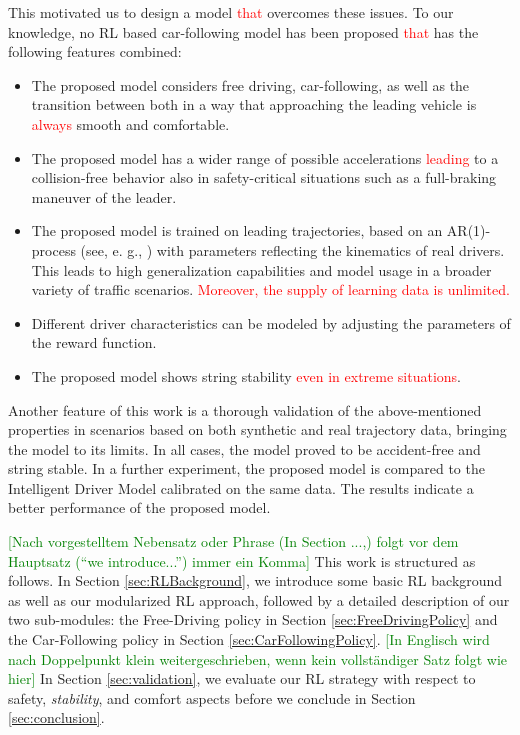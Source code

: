 \documentclass[review]{elsarticle}
\providecommand{\red}[1]{\textcolor{red}{#1}}
\providecommand{\green}[1]{\textcolor{green}{#1}}
\providecommand{\martin}[1]{\red{#1}} %
\providecommand{\martinc}[1]{\green{[#1]}} %
\providecommand{\3}{{\ss}}
\begin{document}
This motivated us to design a model \martin{that} overcomes these issues.
To our knowledge, no RL based car-following model has been proposed \martin{that} has the following features combined:


\begin{itemize}
	\item  The proposed model considers free driving,
          car-following, as well as the transition between both in a
          way that approaching the leading vehicle is \martin{always} smooth and comfortable.
	\item The proposed model has a wider range of possible
          accelerations \martin{leading} to a collision-free behavior
          also in safety-critical situations such as a full-braking maneuver of the leader.
	\item The proposed model is trained on leading trajectories,
          based on an AR(1)-process (see, e. g., \cite{HonerkampEngl})
          with parameters reflecting the kinematics of real
          drivers. This leads to high generalization capabilities and
          model usage in a broader variety of traffic
          scenarios. \martin{Moreover, the supply of learning data is
            unlimited.} 
	\item Different driver characteristics can be modeled by adjusting the parameters of the reward function.
	\item The proposed model shows string stability \martin{even in
          extreme situations}.
	
\end{itemize}

Another feature of this work is a thorough validation of the above-mentioned properties in scenarios based on both synthetic and real trajectory data, bringing the model to its limits. 
In all cases, the model proved to be accident-free and string stable.
In a further experiment, the proposed model is compared to the Intelligent Driver Model calibrated on the same data. The results indicate a better performance of the proposed model.

\martinc{Nach vorgestelltem Nebensatz oder Phrase (In Section ...,) folgt vor dem
  Hauptsatz (``we introduce...'') immer ein Komma}
This work is structured as follows. In Section \ref{sec:RLBackground},
we introduce some basic RL background as well as our modularized RL
approach, followed by a detailed description of our two sub-modules:
the Free-Driving policy in Section \ref{sec:FreeDrivingPolicy} and the
Car-Following policy in Section
\ref{sec:CarFollowingPolicy}. \martinc{In Englisch wird nach
  Doppelpunkt klein weitergeschrieben, wenn kein vollst\"andiger Satz
  folgt wie hier} In Section \ref{sec:validation}, we evaluate our RL
strategy with respect to safety, \emph{stability}, and comfort aspects
before we conclude in Section \ref{sec:conclusion}.
\end{document}
